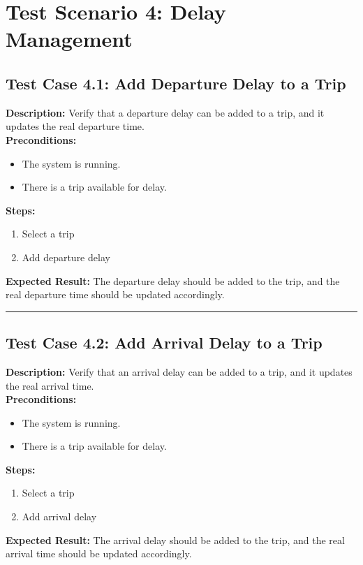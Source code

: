 \documentclass{article}
\begin{document}
\section{Test Scenario 4: Delay Management}
\bigskip
\bigskip
\subsection{Test Case 4.1: Add Departure Delay to a Trip}

\textbf{Description:} Verify that a departure delay can be added to a trip, and it updates the real departure time.\\
\textbf{Preconditions:}
\begin{itemize}
  \item The system is running.
  \item There is a trip available for delay.
\end{itemize}
\textbf{Steps:}
\begin{enumerate}
  \item Select a trip
  \item Add departure delay
\end{enumerate}
\textbf{Expected Result:} The departure delay should be added to the trip, and the real departure time should be updated accordingly.

\bigskip
\hrule
\bigskip

\subsection{Test Case 4.2: Add Arrival Delay to a Trip}

\textbf{Description:} Verify that an arrival delay can be added to a trip, and it updates the real arrival time.\\
\textbf{Preconditions:}
\begin{itemize}
  \item The system is running.
  \item There is a trip available for delay.
\end{itemize}
\textbf{Steps:}
\begin{enumerate}
    \item Select a trip
    \item Add arrival delay
\end{enumerate}
\textbf{Expected Result:} The arrival delay should be added to the trip, and the real arrival time should be updated accordingly.

\pagebreak
\end{document}
